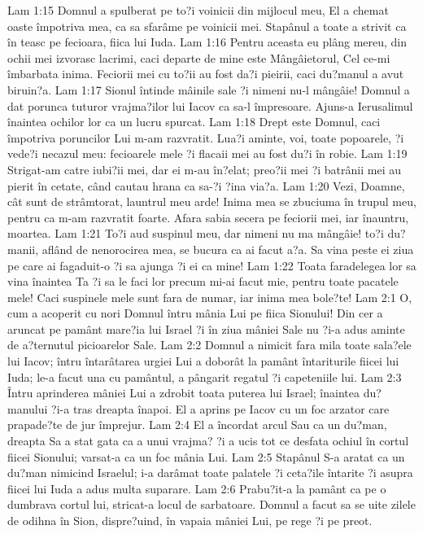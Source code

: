 Lam 1:15  Domnul a spulberat pe to?i voinicii din mijlocul meu, El a chemat oaste împotriva mea, ca sa sfarâme pe voinicii mei. Stapânul a toate a strivit ca în teasc pe fecioara, fiica lui Iuda.
Lam 1:16  Pentru aceasta eu plâng mereu, din ochii mei izvorasc lacrimi, caci departe de mine este Mângâietorul, Cel ce-mi îmbarbata inima. Feciorii mei cu to?ii au fost da?i pieirii, caci du?manul a avut biruin?a.
Lam 1:17  Sionul întinde mâinile sale ?i nimeni nu-l mângâie! Domnul a dat porunca tuturor vrajma?ilor lui Iacov ca sa-l împresoare. Ajuns-a Ierusalimul înaintea ochilor lor ca un lucru spurcat.
Lam 1:18  Drept este Domnul, caci împotriva poruncilor Lui m-am razvratit. Lua?i aminte, voi, toate popoarele, ?i vede?i necazul meu: fecioarele mele ?i flacaii mei au fost du?i în robie.
Lam 1:19  Strigat-am catre iubi?ii mei, dar ei m-au în?elat; preo?ii mei ?i batrânii mei au pierit în cetate, când cautau hrana ca sa-?i ?ina via?a.
Lam 1:20  Vezi, Doamne, cât sunt de strâmtorat, launtrul meu arde! Inima mea se zbuciuma în trupul meu, pentru ca m-am razvratit foarte. Afara sabia secera pe feciorii mei, iar înauntru, moartea.
Lam 1:21  To?i aud suspinul meu, dar nimeni nu ma mângâie! to?i du?manii, aflând de nenorocirea mea, se bucura ca ai facut a?a. Sa vina peste ei ziua pe care ai fagaduit-o ?i sa ajunga ?i ei ca mine!
Lam 1:22  Toata faradelegea lor sa vina înaintea Ta ?i sa le faci lor precum mi-ai facut mie, pentru toate pacatele mele! Caci suspinele mele sunt fara de numar, iar inima mea bole?te!
Lam 2:1  O, cum a acoperit cu nori Domnul întru mânia Lui pe fiica Sionului! Din cer a aruncat pe pamânt mare?ia lui Israel ?i în ziua mâniei Sale nu ?i-a adus aminte de a?ternutul picioarelor Sale.
Lam 2:2  Domnul a nimicit fara mila toate sala?ele lui Iacov; întru întarâtarea urgiei Lui a doborât la pamânt întariturile fiicei lui Iuda; le-a facut una cu pamântul, a pângarit regatul ?i capeteniile lui.
Lam 2:3  Întru aprinderea mâniei Lui a zdrobit toata puterea lui Israel; înaintea du?manului ?i-a tras dreapta înapoi. El a aprins pe Iacov cu un foc arzator care prapade?te de jur împrejur.
Lam 2:4  El a încordat arcul Sau ca un du?man, dreapta Sa a stat gata ca a unui vrajma? ?i a ucis tot ce desfata ochiul în cortul fiicei Sionului; varsat-a ca un foc mânia Lui.
Lam 2:5  Stapânul S-a aratat ca un du?man nimicind Israelul; i-a darâmat toate palatele ?i ceta?ile întarite ?i asupra fiicei lui Iuda a adus multa suparare.
Lam 2:6  Prabu?it-a la pamânt ca pe o dumbrava cortul lui, stricat-a locul de sarbatoare. Domnul a facut sa se uite zilele de odihna în Sion, dispre?uind, în vapaia mâniei Lui, pe rege ?i pe preot.
